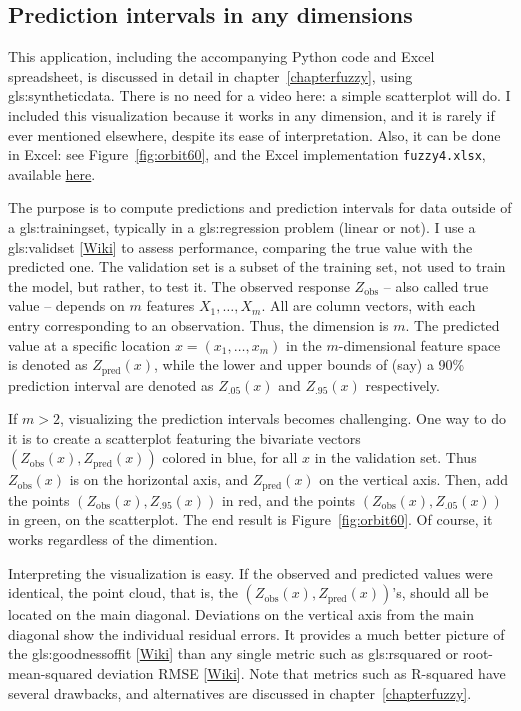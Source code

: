 \documentclass[oneside,10pt]{book}
\begin{document}
\subsection{Prediction intervals in any dimensions}

This application, including the accompanying Python code and Excel spreadsheet, is discussed in detail in chapter~\ref{chapterfuzzy}, using \gls{gls:syntheticdata}. There is no need for a video here: a simple
scatterplot will do. I included this visualization because it works in any dimension, and it is rarely if ever mentioned elsewhere, despite its ease of interpretation. Also, it can be done in Excel: see Figure~\ref{fig:orbit60}, and the
Excel implementation \texttt{fuzzy4.xlsx}, available \href{https://ln5.sync.com/dl/0caeb8e10/mztnibg9-xrkdks7g-r8bsgabw-3fsizwif}{here}.

The purpose is to compute predictions and prediction intervals for data outside of a \gls{gls:trainingset}, typically in a \gls{gls:regression} problem (linear or not). I  use a \gls{gls:validset} [\href{https://en.wikipedia.org/wiki/Training,_validation,_and_test_data_sets}{Wiki}] to assess performance, comparing the true value with the predicted one. The validation set is a subset of the training set, not used to train the model, but rather, to test it. The observed response $Z_\text{obs}$ -- also called true value -- depends on $m$ features $X_1,\dots,X_m$. All are column vectors, with each entry corresponding to an observation.  Thus, the dimension is $m$. The predicted
value at a specific location $x=(x_1,\dots,x_m)$ in the $m$-dimensional feature space is denoted as $Z_\text{pred}(x)$, while the lower and upper bounds of (say) a 90\% prediction interval are denoted as $Z_\text{.05}(x)$ and $Z_\text{.95}(x)$ respectively.

If $m>2$, visualizing the prediction intervals becomes challenging. One way to do it is to create a scatterplot featuring the bivariate vectors
$(Z_\text{obs}(x), Z_\text{pred}(x))$ colored in blue, for all $x$ in the validation set. Thus $Z_\text{obs}(x)$ is on the horizontal axis, and $Z_\text{pred}(x)$ on the vertical axis.
Then, add the points $(Z_\text{obs}(x),Z_\text{.95}(x))$ in red, and the points $(Z_\text{obs}(x),Z_\text{.05}(x))$ in green, on the scatterplot.
The end result is Figure~\ref{fig:orbit60}. Of course, it works regardless of the dimention.

Interpreting the visualization is easy. If the observed and predicted values were identical, the point cloud, that is, the $(Z_\text{obs}(x),Z_\text{pred}(x))$'s, should all be located on the main diagonal. Deviations on the vertical axis from the main diagonal show the individual residual errors. It provides a much better picture of the  \gls{gls:goodnessoffit} [\href{https://en.wikipedia.org/wiki/Goodness_of_fit}{Wiki}]
than any single metric such as \gls{gls:rsquared} or root-mean-squared deviation \textcolor{index}{RMSE} [\href{https://en.wikipedia.org/wiki/Root-mean-square_deviation}{Wiki}]. Note that metrics such as R-squared have several drawbacks, and alternatives are discussed in chapter~\ref{chapterfuzzy}.
\end{document}
